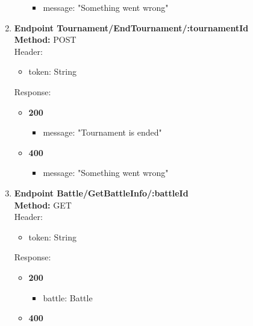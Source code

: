 \begin{enumerate}
\begin{itemize}
        \begin{itemize}
            \item message: "Something went wrong"
        \end{itemize}
    \end{itemize}
    \item \textbf{Endpoint Tournament/EndTournament/:tournamentId} \\
    \textbf{Method:} POST \\
    Header:\\
    \begin{itemize}
        \item token: String
    \end{itemize}
    Response:\\
    \begin{itemize}
        \item \textbf{200} \\
        \begin{itemize}
            \item message: "Tournament is ended"
        \end{itemize}
        \item \textbf{400} \\
        \begin{itemize}
            \item message: "Something went wrong"
        \end{itemize}
    \end{itemize}
    \item \textbf{Endpoint Battle/GetBattleInfo/:battleId} \\
    \textbf{Method:} GET \\
    Header:\\
    \begin{itemize}
        \item token: String
    \end{itemize}
    Response:\\
    \begin{itemize}
        \item \textbf{200} \\
        \begin{itemize}
            \item battle: Battle
        \end{itemize}
        \item \textbf{400} \\
        \begin{itemize}

\end{itemize}
\end{itemize}
\end{enumerate}
